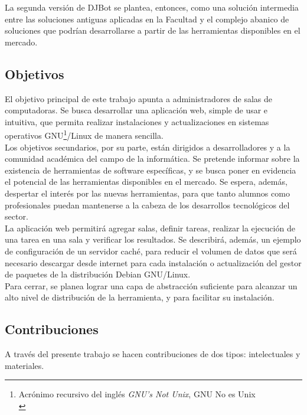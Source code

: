 \documentclass[a4paper,12pt]{article}
\begin{document}
La segunda versión de DJBot se plantea, entonces, como una solución intermedia entre las soluciones antiguas aplicadas en la Facultad y el complejo abanico de soluciones que podrían desarrollarse a partir de las herramientas disponibles en el mercado.\\

\subsection{Objetivos}
\label{sec:orgheadline2}

El objetivo principal de este trabajo apunta a administradores de salas de computadoras. Se busca desarrollar una aplicación web, simple de usar e intuitiva, que permita realizar instalaciones y actualizaciones en sistemas operativos GNU\footnote{Acrónimo recursivo del inglés \emph{GNU's Not Unix}, GNU No es Unix\\}/Linux de manera sencilla.\\

Los objetivos secundarios, por su parte, están dirigidos a desarrolladores y a la comunidad académica del campo de la informática. Se pretende informar sobre la existencia de herramientas de software específicas, y se busca poner en evidencia el potencial de las herramientas disponibles en el mercado. Se espera, además, despertar el interés por las nuevas herramientas, para que tanto alumnos como profesionales puedan mantenerse a la cabeza de los desarrollos tecnológicos del sector.\\

La aplicación web permitirá agregar salas, definir tareas, realizar la ejecución de una tarea en una sala y verificar los resultados. Se describirá, además, un ejemplo de configuración de un servidor caché, para reducir el volumen de datos que será necesario descargar desde internet para cada instalación o actualización del gestor de paquetes de la distribución Debian GNU/Linux.\\

Para cerrar, se planea lograr una capa de abstracción suficiente para alcanzar un alto nivel de distribución de la herramienta, y para facilitar su instalación.\\

\subsection{Contribuciones}
\label{sec:orgheadline3}

A través del presente trabajo se hacen contribuciones de dos tipos: intelectuales y materiales.\\
\end{document}

